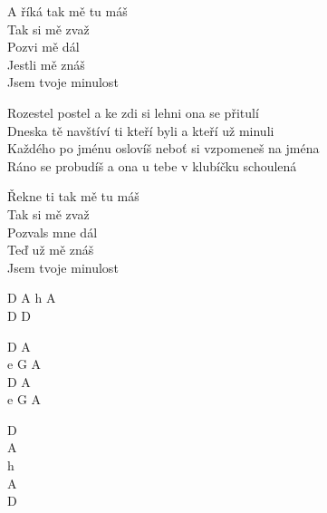 \begin{text}
\vin A říká tak mě tu máš \\
\vin Tak si mě zvaž\\
\vin Pozvi mě dál \\
\vin Jestli mě znáš\\
\vin Jsem tvoje minulost

Rozestel postel a ke zdi si lehni ona se přitulí\\
Dneska tě navštíví ti kteří byli a kteří už minuli\\
Každého po jménu oslovíš neboť si vzpomeneš na jména\\
Ráno se probudíš a ona u tebe v klubíčku schoulená

\vin Řekne ti tak mě tu máš \\
\vin Tak si mě zvaž\\
\vin Pozvals mne dál \\
\vin Teď už mě znáš\\
\vin Jsem tvoje minulost
\end{text}
\begin{chord}
D A h A\\
D D

D A\\
e G A\\
D A\\
e G A

D\\
A\\
h\\
A\\
D
\end{chord}